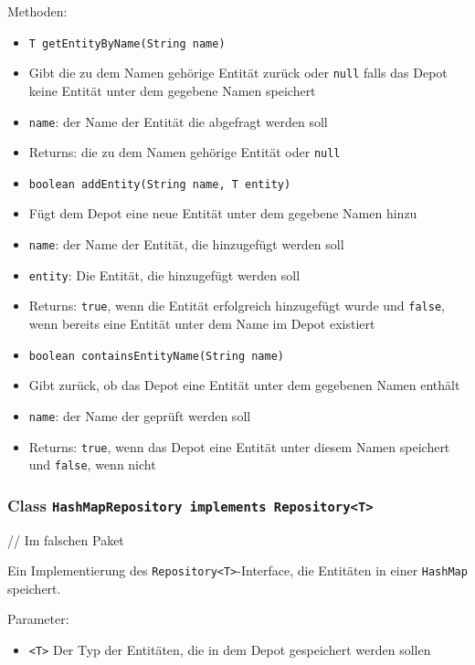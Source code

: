 \documentclass[parskip=full,11pt]{scrartcl}
\begin{document}
Methoden:
\begin{itemize}\itemsep -10pt
	\item \texttt{T getEntityByName(String name)}
	\item[] Gibt die zu dem Namen gehörige Entität zurück oder \texttt{null} falls das Depot keine Entität unter dem gegebene Namen speichert
	\item[] \texttt{name}: der Name der Entität die abgefragt werden soll
	\item[] Returns: die zu dem Namen gehörige Entität oder \texttt{null}
	
	\item \texttt{boolean addEntity(String name, T entity)}
	\item[] Fügt dem Depot eine neue Entität unter dem gegebene Namen hinzu
	\item[] \texttt{name}: der Name der Entität, die hinzugefügt werden soll
	\item[] \texttt{entity}: Die Entität, die hinzugefügt werden soll
	\item[] Returns: \texttt{true}, wenn die Entität erfolgreich hinzugefügt wurde und \texttt{false}, wenn bereits eine Entität unter dem Name im Depot existiert 
	
	\item \texttt{boolean containsEntityName(String name)}
	\item[] Gibt zurück, ob das Depot eine Entität unter dem gegebenen Namen enthält
	\item[] \texttt{name}: der Name der geprüft werden soll
	\item[] Returns: \texttt{true}, wenn das Depot eine Entität unter diesem Namen speichert und \texttt{false}, wenn nicht
	
\end{itemize}

\subsubsection{Class \texttt{HashMapRepository implements Repository<T>}}

// Im falschen Paket

Ein Implementierung des \texttt{Repository<T>}-Interface, die Entitäten in einer \texttt{HashMap} speichert.

Parameter:

\begin{itemize}\itemsep -10pt
	\item \texttt{<T>} Der Typ der Entitäten, die in dem Depot gespeichert werden sollen
\end{itemize}
\end{document}
